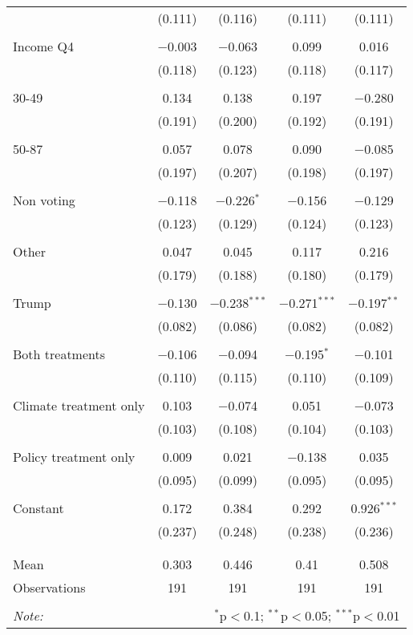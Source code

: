 \begin{tabular}{@{\extracolsep{5pt}}lcccc}
  & (0.111) & (0.116) & (0.111) & (0.111) \\ 
  & & & & \\ 
 Income Q4 & $-$0.003 & $-$0.063 & 0.099 & 0.016 \\ 
  & (0.118) & (0.123) & (0.118) & (0.117) \\ 
  & & & & \\ 
 30-49 & 0.134 & 0.138 & 0.197 & $-$0.280 \\ 
  & (0.191) & (0.200) & (0.192) & (0.191) \\ 
  & & & & \\ 
 50-87 & 0.057 & 0.078 & 0.090 & $-$0.085 \\ 
  & (0.197) & (0.207) & (0.198) & (0.197) \\ 
  & & & & \\ 
 Non voting & $-$0.118 & $-$0.226$^{*}$ & $-$0.156 & $-$0.129 \\ 
  & (0.123) & (0.129) & (0.124) & (0.123) \\ 
  & & & & \\ 
 Other & 0.047 & 0.045 & 0.117 & 0.216 \\ 
  & (0.179) & (0.188) & (0.180) & (0.179) \\ 
  & & & & \\ 
 Trump & $-$0.130 & $-$0.238$^{***}$ & $-$0.271$^{***}$ & $-$0.197$^{**}$ \\ 
  & (0.082) & (0.086) & (0.082) & (0.082) \\ 
  & & & & \\ 
 Both treatments & $-$0.106 & $-$0.094 & $-$0.195$^{*}$ & $-$0.101 \\ 
  & (0.110) & (0.115) & (0.110) & (0.109) \\ 
  & & & & \\ 
 Climate treatment only & 0.103 & $-$0.074 & 0.051 & $-$0.073 \\ 
  & (0.103) & (0.108) & (0.104) & (0.103) \\ 
  & & & & \\ 
 Policy treatment only & 0.009 & 0.021 & $-$0.138 & 0.035 \\ 
  & (0.095) & (0.099) & (0.095) & (0.095) \\ 
  & & & & \\ 
 Constant & 0.172 & 0.384 & 0.292 & 0.926$^{***}$ \\ 
  & (0.237) & (0.248) & (0.238) & (0.236) \\ 
  & & & & \\ 
\hline \\[-1.8ex] 
Mean & 0.303 & 0.446 & 0.41 & 0.508 \\ 
Observations & 191 & 191 & 191 & 191 \\ 
\hline 
\hline \\[-1.8ex] 
\textit{Note:}  & \multicolumn{4}{r}{$^{*}$p$<$0.1; $^{**}$p$<$0.05; $^{***}$p$<$0.01} \\ 
\end{tabular} 
